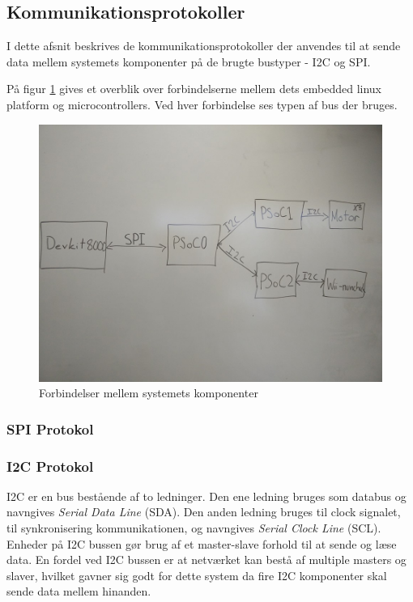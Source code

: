 \subsection{Kommunikationsprotokoller}

I dette afsnit beskrives de kommunikationsprotokoller der anvendes til at sende data mellem systemets komponenter på de brugte bustyper - I2C og SPI.

På figur \ref{fig:kommunikationsOverblik} gives et overblik over forbindelserne mellem dets embedded linux platform og microcontrollers. Ved hver forbindelse ses typen af bus der bruges.

\begin{figure}[H]
	\centering
	\includegraphics[width=\textwidth] {Systemarkitektur/images/overordnetstruktur}
	\caption{Forbindelser mellem systemets komponenter}
	\label{fig:kommunikationsOverblik}
\end{figure}

\subsubsection{SPI Protokol}

\subsubsection{I2C Protokol}
\label{afsnit:I2CProtokol}

I2C\cite{I2C} er en bus bestående af to ledninger. Den ene ledning bruges som databus og navngives \textit{Serial Data Line} (SDA). Den anden ledning bruges til clock signalet, til synkronisering kommunikationen, og navngives \textit{Serial Clock Line} (SCL). Enheder på I2C bussen gør brug af et master-slave forhold til at sende og læse data. En fordel ved I2C bussen er at netværket kan bestå af multiple masters og slaver, hvilket gavner sig godt for dette system da fire I2C komponenter skal sende data mellem hinanden.

